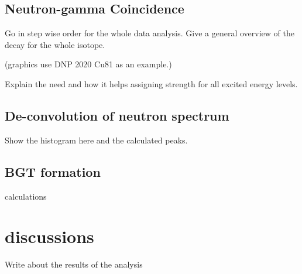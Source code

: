 \documentclass[a4paper,12pt,twoside]{report}
\begin{document}
\subsection{Neutron-gamma Coincidence}
Go in step wise order for the whole data analysis.
Give a general overview of the decay for the whole isotope.

(graphics use DNP 2020 Cu81 as an example.)

Explain the need and how it helps assigning strength for all excited energy levels.
\subsection{De-convolution of neutron spectrum}
Show the histogram here and the calculated peaks.

\subsection{BGT formation}
calculations
\section{discussions}

Write about the results of the analysis
\section{}








\clearpage 


\end{document}
